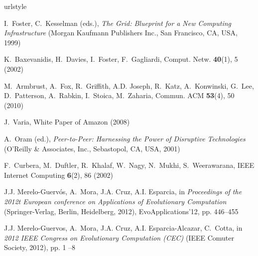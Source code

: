 
% 



%
%
\begin{thebibliography}{10}
\providecommand{\url}[1]{{#1}}
\providecommand{\urlprefix}{URL }
\expandafter\ifx\csname urlstyle\endcsname\relax
  \providecommand{\doi}[1]{DOI \discretionary{}{}{}#1}\else
  \providecommand{\doi}{DOI \discretionary{}{}{}\begingroup
  \urlstyle{rm}\Url}\fi

I.~Foster, C.~Kesselman (eds.), \emph{The Grid: Blueprint for a New Computing
  Infrastructure} (Morgan Kaufmann Publishers Inc., San Francisco, CA, USA,
  1999)

K.~Baxevanidis, H.~Davies, I.~Foster, F.~Gagliardi, Comput. Netw.
  \textbf{40}(1), 5 (2002)

M.~Armbrust, A.~Fox, R.~Griffith, A.D. Joseph, R.~Katz, A.~Konwinski, G.~Lee,
  D.~Patterson, A.~Rabkin, I.~Stoica, M.~Zaharia, Commun. ACM \textbf{53}(4),
  50 (2010)

J.~Varia, White Paper of Amazon  (2008)

A.~Oram (ed.), \emph{Peer-to-Peer: Harnessing the Power of Disruptive
  Technologies} (O'Reilly \& Associates, Inc., Sebastopol, CA, USA, 2001)

F.~Curbera, M.~Duftler, R.~Khalaf, W.~Nagy, N.~Mukhi, S.~Weerawarana, IEEE
  Internet Computing \textbf{6}(2), 86 (2002)

J.J. Merelo-Guerv\'{o}s, A.~Mora, J.A. Cruz, A.I. Esparcia, in
  \emph{Proceedings of the 2012t European conference on Applications of
  Evolutionary Computation} (Springer-Verlag, Berlin, Heidelberg, 2012),
  EvoApplications'12, pp. 446--455

J.J. Merelo-Guervos, A.~Mora, J.A. Cruz, A.I. Esparcia-Alcazar, C.~Cotta, in
  \emph{2012 IEEE Congress on Evolutionary Computation (CEC)} (IEEE Comuter
  Society, 2012), pp. 1 --8


\end{thebibliography}

